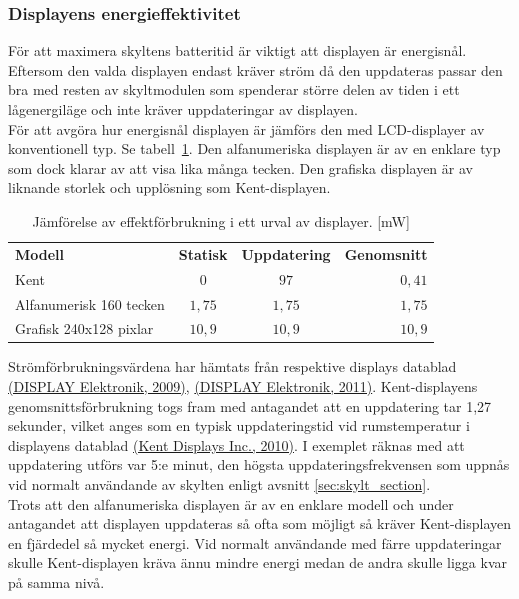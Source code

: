 \documentclass[a4paper,11pt]{article}
\begin{document}
\subsubsection{Displayens energieffektivitet}
För att maximera skyltens batteritid är viktigt att displayen är energisnål. Eftersom den valda displayen endast kräver ström då den uppdateras passar den bra med resten av skyltmodulen som spenderar större delen av tiden i ett lågenergiläge och inte kräver uppdateringar av displayen.\\

För att avgöra hur energisnål displayen är jämförs den med LCD-displayer av konventionell typ. Se tabell~\ref{tab:kenttable}. Den alfanumeriska displayen är av en enklare typ som dock klarar av att visa lika många tecken. Den grafiska displayen är av liknande storlek och upplösning som Kent-displayen.\\

\begin{table}[h]
\centering
    \begin{tabular}{|l|c|c|r|}
    {\bf Modell} & {\bf Statisk} & {\bf Uppdatering} & {\bf Genomsnitt} \\
    Kent & $0$ & $97$ & $0,41$ \\
    Alfanumerisk 160 tecken & $1,75$ & $1,75$ & $1,75$ \\
    Grafisk 240x128 pixlar & $10,9$ & $10,9$ & $10,9$ \\
    \end{tabular}
\caption{Jämförelse av effektförbrukning i ett urval av displayer. [mW]}
\label{tab:kenttable}
\end{table}

Strömförbrukningsvärdena har hämtats från respektive displays datablad \hyperref[lcdalfa]{(DISPLAY Elektronik, 2009)}, \hyperref[lcdgraph]{(DISPLAY Elektronik, 2011)}. Kent-displayens genomsnittsförbrukning togs fram med antagandet att en uppdatering tar 1,27 sekunder, vilket anges som en typisk uppdateringstid vid rumstemperatur i displayens datablad \hyperref[kent]{(Kent Displays Inc., 2010)}. I exemplet räknas med att uppdatering utförs var 5:e minut, den högsta uppdateringsfrekvensen som uppnås vid normalt användande av skylten enligt avsnitt \ref{sec:skylt_section}.\\

Trots att den alfanumeriska displayen är av en enklare modell och under antagandet att displayen uppdateras så ofta som möjligt så kräver Kent-displayen en fjärdedel så mycket energi. Vid normalt användande med färre uppdateringar skulle Kent-displayen kräva ännu mindre energi medan de andra skulle ligga kvar på samma nivå.\\
\end{document}
